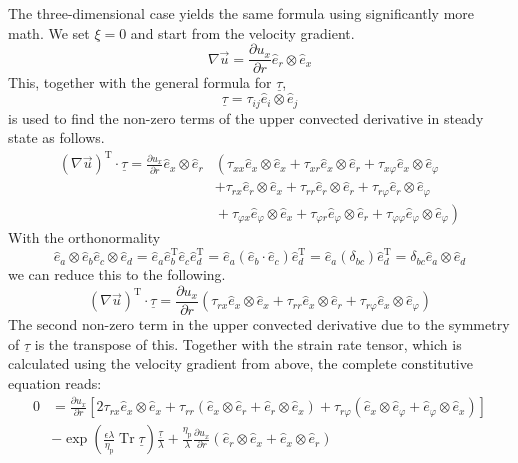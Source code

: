 \documentclass[a4paper,12pt]{scrartcl}
\newcommand{\ma}[1]{\underline{#1}}
\DeclareMathOperator{\Tr}{Tr}
\begin{document}
The three-dimensional case yields the same formula using significantly more math.
We set $\xi=0$ and start from the velocity gradient.
\begin{equation}
	\nabla\vec{u} = \frac{\partial u_x}{\partial r}\hat{e}_r\otimes\hat{e}_x
\end{equation}
This, together with the general formula for $\ma{\tau}$,
\begin{equation}
	\ma{\tau} = \tau_{ij}\hat{e}_i\otimes\hat{e}_j
\end{equation}
is used to find the non-zero terms of the upper convected derivative in steady state as follows.
\begin{equation}
	\begin{split}
		\left(\nabla\vec{u}\right)^\mathrm{T}\cdot\ma{\tau} = \frac{\partial u_x}{\partial r}\hat{e}_x\otimes\hat{e}_r&\left(\tau_{xx}\hat{e}_x\otimes\hat{e}_x+\tau_{xr}\hat{e}_x\otimes\hat{e}_r+\tau_{x\varphi}\hat{e}_x\otimes\hat{e}_\varphi\right.\\
		&+\tau_{rx}\hat{e}_r\otimes\hat{e}_x+\tau_{rr}\hat{e}_r\otimes\hat{e}_r+\tau_{r\varphi}\hat{e}_r\otimes\hat{e}_\varphi\\
		&\left.{ }+\tau_{\varphi x}\hat{e}_\varphi\otimes\hat{e}_x+\tau_{\varphi r}\hat{e}_\varphi\otimes\hat{e}_r+\tau_{\varphi\varphi}\hat{e}_\varphi\otimes\hat{e}_\varphi\right)
	\end{split}
\end{equation}
With the orthonormality
\begin{equation}
	\hat{e}_a\otimes\hat{e}_b\hat{e}_c\otimes\hat{e}_d = \hat{e}_a\hat{e}_b^\mathrm{T}\hat{e}_c\hat{e}_d^\mathrm{T} = \hat{e}_a\left(\hat{e}_b\cdot\hat{e}_c\right)\hat{e}_d^\mathrm{T} = \hat{e}_a\left(\delta_{bc}\right)\hat{e}_d^\mathrm{T} = \delta_{bc}\hat{e}_a\otimes\hat{e}_d
\end{equation}
we can reduce this to the following.
\begin{equation}
	\left(\nabla\vec{u}\right)^\mathrm{T}\cdot\ma{\tau} = \frac{\partial u_x}{\partial r}\left(\tau_{rx}\hat{e}_x\otimes\hat{e}_x+\tau_{rr}\hat{e}_x\otimes\hat{e}_r+\tau_{r\varphi}\hat{e}_x\otimes\hat{e}_\varphi\right)
\end{equation}
The second non-zero term in the upper convected derivative due to the symmetry of $\ma{\tau}$ is the transpose of this. Together with the strain rate tensor, which is calculated using the velocity gradient from above, the complete constitutive equation reads:
\begin{equation}
	\begin{split}
		0 &= \frac{\partial u_x}{\partial r}\left[2\tau_{rx}\hat{e}_x\otimes\hat{e}_x+\tau_{rr}\left(\hat{e}_x\otimes\hat{e}_r+\hat{e}_r\otimes\hat{e}_x\right)+\tau_{r\varphi}\left(\hat{e}_x\otimes\hat{e}_\varphi + \hat{e}_\varphi\otimes\hat{e}_x\right)\right]\\
		&- \exp\left(\frac{\epsilon\lambda}{\eta_\text{p}}\Tr\ma{\tau}\right)\frac{\ma{\tau}}{\lambda} + \frac{\eta_\text{p}}{\lambda}\frac{\partial u_x}{\partial r}\left(\hat{e}_r\otimes\hat{e}_x + \hat{e}_x\otimes\hat{e}_r\right)
	\end{split}
\end{equation}
\end{document}
